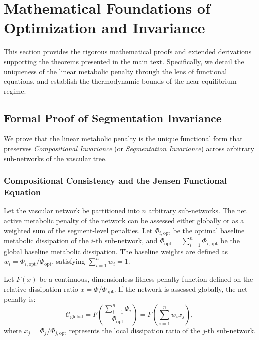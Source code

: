 \documentclass[11pt,a4paper]{article}
\theoremstyle{remark}
\begin{document}
\section{Mathematical Foundations of Optimization and Invariance}
\label{sec:S7}

This section provides the rigorous mathematical proofs and extended derivations
supporting the theorems presented in the main text. Specifically, we detail the
uniqueness of the linear metabolic penalty through the lens of functional
equations, and establish the thermodynamic bounds of the near-equilibrium
regime.

\subsection{Formal Proof of Segmentation Invariance}
\label{sec:S7_segmentation}

We prove that the linear metabolic penalty is the unique functional form that
preserves \emph{Compositional Invariance} (or \emph{Segmentation Invariance})
across arbitrary sub-networks of the vascular tree.

\subsubsection{Compositional Consistency and the Jensen Functional Equation}

Let the vascular network be partitioned into $n$ arbitrary sub-networks. The net
active metabolic penalty of the network can be assessed either globally or as a
weighted sum of the segment-level penalties. Let $\Phi_{i,\mathrm{opt}}$ be the
optimal baseline metabolic dissipation of the $i$-th sub-network, and
$\Phi_{\mathrm{opt}} = \sum_{i=1}^n \Phi_{i,\mathrm{opt}}$ be the global
baseline metabolic dissipation. The baseline weights are defined as $w_i =
\Phi_{i,\mathrm{opt}} / \Phi_{\mathrm{opt}}$, satisfying $\sum_{i=1}^n w_i = 1$.

Let $F(x)$ be a continuous, dimensionless fitness penalty function defined on
the relative dissipation ratio $x = \Phi / \Phi_{\mathrm{opt}}$. If the network
is assessed globally, the net penalty is:
\begin{equation}
    \mathcal{C}_{\mathrm{global}} = F\left( \frac{\sum_{i=1}^n \Phi_i}{\Phi_{\mathrm{opt}}} \right) = F\left( \sum_{i=1}^n w_i x_j \right),
\end{equation}
where $x_j = \Phi_j / \Phi_{j,\mathrm{opt}}$ represents the local dissipation
ratio of the $j$-th sub-network.
\end{document}
